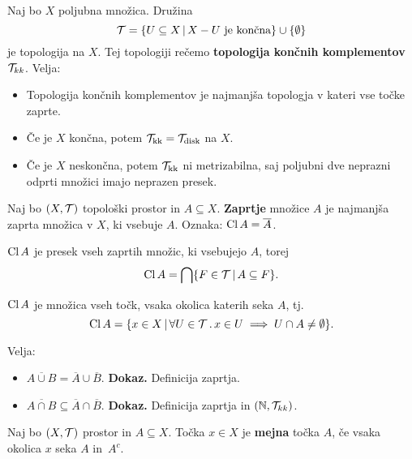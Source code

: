 \begin{primer}
    Naj bo $X$ poljubna množica. Družina $$\mathcal{T} = \{U \subseteq X \,|\, X - U \text{ je končna}\} \cup \{\emptyset\}$$ je topologija na $X$. Tej topologiji rečemo \textbf{topologija končnih komplementov $\mathcal{T}_{kk}$}. Velja:

    \begin{itemize}
        \item Topologija končnih komplementov je najmanjša topologja v kateri vse točke zaprte. 
        \item Če je $X$ končna, potem $\mathcal{T}_{\text{kk}}=\mathcal{T}_{\text{disk}}$ na $X$.
        \item Če je \(X\) neskončna, potem \(\mathcal{T}_{\text{kk}}\) ni metrizabilna, saj poljubni dve neprazni odprti množici imajo neprazen presek.
    \end{itemize}    
\end{primer}

\begin{definicija}
    Naj bo $(X, \mathcal{T})$ topološki prostor in $A \subseteq X$. \textbf{Zaprtje} množice $A$ je najmanjša zaprta množica v $X$, ki vsebuje $A$. Oznaka: $\operatorname{Cl} A = \overline{A}$.
\end{definicija}

\begin{trditev}
    $\operatorname{Cl} A$ je presek vseh zaprtih množic, ki vsebujejo $A$, torej $$\operatorname{Cl} A = \bigcap \{F \in \mathcal{T} \,|\, A \subseteq F\}.$$
\end{trditev}

\begin{trditev}
    $\operatorname{Cl} A$ je množica vseh točk, vsaka okolica katerih seka $A$, tj. $$\operatorname{Cl} A = \{x \in X \,|\, \forall U \in \mathcal{T} \,.\, x \in U \implies U \cap A \neq \emptyset\}.$$
\end{trditev}

\begin{primer}
    Velja:
    \begin{itemize}
        \item $\overline{A \cup B} = \overline{A} \cup \overline{B}$. \textbf{Dokaz.} Definicija zaprtja.
        \item $\overline{A \cap B} \subseteq \overline{A} \cap \overline{B}$. \textbf{Dokaz.} Definicija zaprtja in $(\mathbb{N}, \mathcal{T}_{kk})$.
    \end{itemize}
\end{primer}

\begin{definicija}
    Naj bo $(X, \mathcal{T})$ prostor in $A \subseteq X$. Točka $x \in X$ je \textbf{mejna} točka $A$, če vsaka okolica $x$ seka $A$ in~$A^c$.
\end{definicija}

